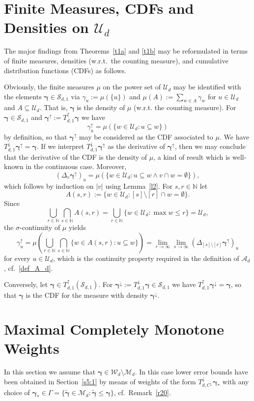 \documentclass{article}
\newcommand{\N}  {{\mathbb N}}
\newcommand{\bg}{{\boldsymbol{\gamma}}}
\newcommand{\U}  {\mathcal{U}}
\newcommand{\W}  {\mathcal{W}}
\newcommand{\M}  {\mathcal{M}}
\newcommand{\SSS}{\mathcal{S}}
\newcommand{\A}{\mathcal{A}}
\newcommand{\lo}{\downarrow}
\newcommand{\up}{\uparrow}
\theoremstyle{plain}
\theoremstyle{definition}
\begin{document}
\section{Finite Measures, CDFs and Densities on $\U_d$}
\label{r8}

The major findings from Theorems~\ref{t1a} and \ref{t1b} may be
reformulated in terms of finite measures, densities (w.r.t.\ the
counting measure), and cumulative distribution functions (CDFs) as 
follows.

Obviously, the finite measures 
$\mu$ on the power set of $\U_d$ may be identified with the
elements $\bg \in \SSS_{d,1}$ via
$\gamma_u := \mu(\{u\})$ and $\mu(A) := \sum_{w \in A} \gamma_w$
for $u \in \U_d$ and $A \subseteq \U_d$. 
That is, $\bg$ is the density of $\mu$ (w.r.t. the counting measure).
For $\bg \in \SSS_{d,1}$
and $\bg^\up := T^\up_{d,1} \bg$ we have
\[
\gamma^\up_u =
\mu(\{ w \in \U_d : u \subseteq w\})
\]
by definition, so that $\bg^\up$
may be considered as the CDF associated to $\mu$. 
We have $T^\lo_{d,1} \bg^\up = \bg$.
If we interpret $T^\lo_{d,1} \bg^\up$ as the derivative of $\bg^\up$,
then we may conclude that the
derivative of the CDF is the density of $\mu$, 
a kind of result which is well-known in the continuous case.
Moreover,
\[
\left(\Delta_v \bg^\up \right)_u =  
\mu(\{ w \in \U_d : u \subseteq w \wedge v \cap w = \emptyset\}),
\]
which follows by induction on $|v|$ using Lemma~\ref{l2}. 
For $s,r \in \N$ 
let 
\[
A(s,r) := \{ w \in \U_d : [s] \setminus [r] \cap w = \emptyset\}.
\]
Since 
\[
\bigcup_{r \in \N} \bigcap_{s \in \N} A(s,r) =
\bigcup_{r \in \N} \{ w \in \U_d : \max w \leq r\} = \U_d,
\]
the $\sigma$-continuity of $\mu$ yields
\[
\gamma^\up_u = \mu
\left(
\bigcup_{r \in \N} \bigcap_{s \in \N} \{ w \in A(s,r) : u \subseteq w\} 
\right) 
=
\lim_{r \to \infty} \lim_{s \to \infty}
\left( \Delta_{[s] \setminus [r]} \bg^\up \right)_u
\]
for every $u \in \U_d$, which is the continuity property required
in the definition of $\A_d$,
cf.\ \eqref{def_A_d}.

Conversely, let $\bg \in T^{\up}_{d,1} (\SSS_{d,1})$.
For $\bg^\lo := T^{\lo}_{d,1} \bg \in \SSS_{d,1}$ we have
$T^{\up}_{d,1} \bg^\lo = \bg$,
so that $\bg$ is the CDF for the measure with density 
$\bg^\lo$.

\section{Maximal Completely Monotone Weights}\label{a3}

In this section we assume that 
$\bg \in \W_d \setminus \M_d$. In this
case lower error bounds have been obtained in Section~\ref{s5:1} by
means of weights of the form $T^\lo_{d,C^\lo} \bg_\ast$ with any choice of
$\bg_\ast \in \Gamma 
= \{ \widetilde{\bg} \in \M_d : \widetilde{\bg} \le \bg \}$, 
cf.\ Remark~\ref{r20}.
\end{document}
